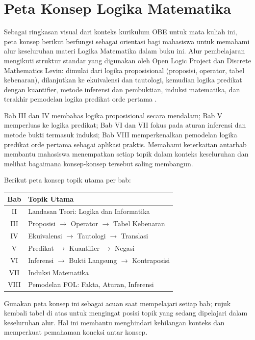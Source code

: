 \section{Peta Konsep Logika Matematika}

Sebagai ringkasan visual dari konteks kurikulum OBE untuk mata kuliah ini, peta konsep berikut berfungsi sebagai orientasi bagi mahasiswa untuk memahami alur keseluruhan materi Logika Matematika dalam buku ini. Alur pembelajaran mengikuti struktur standar yang digunakan oleh Open Logic Project dan Discrete Mathematics Levin: dimulai dari logika proposisional (proposisi, operator, tabel kebenaran), dilanjutkan ke ekuivalensi dan tautologi, kemudian logika predikat dengan kuantifier, metode inferensi dan pembuktian, induksi matematika, dan terakhir pemodelan logika predikat orde pertama \cite{openlogic,levin_discrete}.

Bab III dan IV membahas logika proposisional secara mendalam; Bab V memperluas ke logika predikat; Bab VI dan VII fokus pada aturan inferensi dan metode bukti termasuk induksi; Bab VIII memperkenalkan pemodelan logika predikat orde pertama sebagai aplikasi praktis. Memahami keterkaitan antarbab membantu mahasiswa menempatkan setiap topik dalam konteks keseluruhan dan melihat bagaimana konsep-konsep tersebut saling membangun.

Berikut peta konsep topik utama per bab:

\begin{center}
\begin{tabular}{|c|l|}
\hline
\textbf{Bab} & \textbf{Topik Utama} \\
\hline
II & Landasan Teori: Logika dan Informatika \\
III & Proposisi $\rightarrow$ Operator $\rightarrow$ Tabel Kebenaran \\
IV & Ekuivalensi $\rightarrow$ Tautologi $\rightarrow$ Translasi \\
V & Predikat $\rightarrow$ Kuantifier $\rightarrow$ Negasi \\
VI & Inferensi $\rightarrow$ Bukti Langsung $\rightarrow$ Kontraposisi \\
VII & Induksi Matematika \\
VIII & Pemodelan FOL: Fakta, Aturan, Inferensi \\
\hline
\end{tabular}
\end{center}

Gunakan peta konsep ini sebagai acuan saat mempelajari setiap bab; rujuk kembali tabel di atas untuk mengingat posisi topik yang sedang dipelajari dalam keseluruhan alur. Hal ini membantu menghindari kehilangan konteks dan memperkuat pemahaman koneksi antar konsep.
